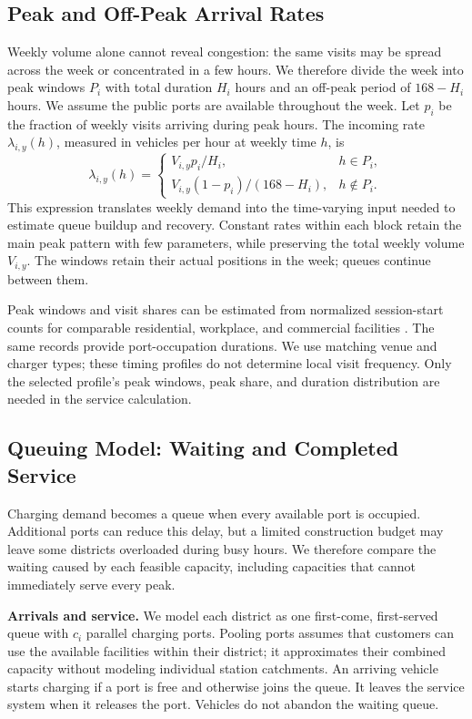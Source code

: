 \documentclass[12pt]{article}
\begin{document}
\subsection{Peak and Off-Peak Arrival Rates}
\label{sec:arrival-rates}
Weekly volume alone cannot reveal congestion: the same visits
may be spread across the week or concentrated in a few hours. We therefore divide the
week into peak windows $P_i$ with total duration $H_i$ hours and an off-peak period
of $168-H_i$ hours. We assume the public ports are available throughout the week.
Let $p_i$ be the fraction of weekly visits arriving during peak hours. The incoming
rate $\lambda_{i,y}(h)$, measured in vehicles per hour at weekly time $h$, is
\begin{equation}
\lambda_{i,y}(h)=
\begin{cases}
V_{i,y}p_i/H_i,&h\in P_i,\\
V_{i,y}(1-p_i)/(168-H_i),&h\notin P_i.
\end{cases}\label{eq:arrivals}
\end{equation}
This expression translates weekly demand into the time-varying input needed to estimate
queue buildup and recovery. Constant rates within each block retain the main peak
pattern with few parameters, while preserving the total weekly volume $V_{i,y}$.
The windows retain their actual positions in the week; queues continue between them.

Peak windows and visit shares can be estimated from normalized session-start counts
for comparable residential, workplace, and commercial facilities
\cite{NorwayCharging,NRELWorkplace,KoreaCharging2024}. The same records provide
port-occupation durations. We use matching venue and charger types; these timing
profiles do not determine local visit frequency. Only the selected profile's peak
windows, peak share, and duration distribution are needed in the service calculation.

\subsection{Queuing Model: Waiting and Completed Service}
\label{sec:queue}
Charging demand becomes a queue when every available port is occupied. Additional
ports can reduce this delay, but a limited construction budget may leave some districts
overloaded during busy hours. We therefore compare the waiting caused by each feasible
capacity, including capacities that cannot immediately serve every peak.

\textbf{Arrivals and service.} We model each district as one first-come, first-served
queue with $c_i$ parallel charging ports. Pooling ports assumes that customers can use
the available facilities within their district; it approximates their combined capacity
without modeling individual station catchments. An arriving vehicle starts charging
if a port is free and otherwise joins the queue. It leaves the service system when
it releases the port. Vehicles do not abandon the waiting queue.
\end{document}
